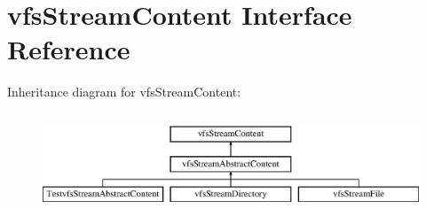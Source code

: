 \hypertarget{interfaceorg_1_1bovigo_1_1vfs_1_1vfs_stream_content}{}\section{vfs\+Stream\+Content Interface Reference}
\label{interfaceorg_1_1bovigo_1_1vfs_1_1vfs_stream_content}
Inheritance diagram for vfs\+Stream\+Content\+:\begin{figure}[H]
\begin{center}
\leavevmode
\includegraphics[height=2.962963cm]{interfaceorg_1_1bovigo_1_1vfs_1_1vfs_stream_content}
\end{center}
\end{figure}
